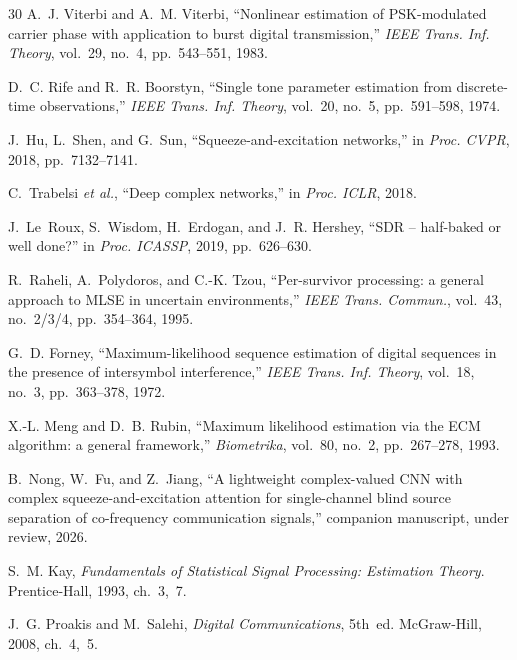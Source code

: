 \documentclass[journal]{IEEEtran}
\begin{document}
\begin{thebibliography}{30}
A.~J. Viterbi and A.~M. Viterbi,
``Nonlinear estimation of PSK-modulated carrier phase with application
to burst digital transmission,''
\emph{IEEE Trans. Inf. Theory}, vol.~29, no.~4, pp.~543--551, 1983.

D.~C. Rife and R.~R. Boorstyn,
``Single tone parameter estimation from discrete-time observations,''
\emph{IEEE Trans. Inf. Theory}, vol.~20, no.~5, pp.~591--598, 1974.

J.~Hu, L.~Shen, and G.~Sun,
``Squeeze-and-excitation networks,''
in \emph{Proc. CVPR}, 2018, pp.~7132--7141.

C.~Trabelsi \emph{et al.},
``Deep complex networks,''
in \emph{Proc. ICLR}, 2018.

J.~Le~Roux, S.~Wisdom, H.~Erdogan, and J.~R. Hershey,
``SDR -- half-baked or well done?''
in \emph{Proc. ICASSP}, 2019, pp.~626--630.

R.~Raheli, A.~Polydoros, and C.-K. Tzou,
``Per-survivor processing: a general approach to MLSE in uncertain
environments,''
\emph{IEEE Trans. Commun.}, vol.~43, no.~2/3/4, pp.~354--364, 1995.

G.~D. Forney,
``Maximum-likelihood sequence estimation of digital sequences in the
presence of intersymbol interference,''
\emph{IEEE Trans. Inf. Theory}, vol.~18, no.~3, pp.~363--378, 1972.

X.-L. Meng and D.~B. Rubin,
``Maximum likelihood estimation via the ECM algorithm: a general
framework,''
\emph{Biometrika}, vol.~80, no.~2, pp.~267--278, 1993.

B.~Nong, W.~Fu, and Z.~Jiang,
``A lightweight complex-valued CNN with complex squeeze-and-excitation
attention for single-channel blind source separation of co-frequency
communication signals,''
companion manuscript, under review, 2026.

S.~M. Kay,
\emph{Fundamentals of Statistical Signal Processing: Estimation
Theory}. Prentice-Hall, 1993, ch.~3,~7.

J.~G. Proakis and M.~Salehi,
\emph{Digital Communications}, 5th~ed. McGraw-Hill, 2008, ch.~4,~5.

\end{thebibliography}
\end{document}
